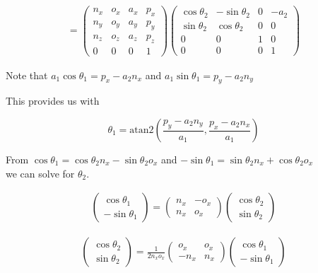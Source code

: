 \[\begin{aligned}
= \begin{pmatrix}
         n_x & o_x & a_x & p_x \\
         n_y & o_y & a_y & p_y\\
         n_z & o_z & a_z & p_z \\ 0 & 0 & 0 & 1\end{pmatrix}
         \begin{pmatrix}\cos \theta_2 & -\sin \theta_2 & 0 & -a_2  \\
         \sin \theta_2 & \cos \theta_2 & 0 & 0 \\ 0 &0 & 1 & 0 \\
         0& 0& 0& 1 \end{pmatrix}
\end{aligned}\]

Note that \(a_1\cos\theta_1 = p_x - a_2n_x\) and
\(a_1\sin\theta_1 = p_y - a_2n_y\)

This provides us with

\[\theta_1 = \mbox{atan2}\left(\frac{p_y - a_2n_y}{a_1} , \frac{p_x - a_2n_x}{a_1}\right)\]

From \(\cos \theta_1 = \cos \theta_2 n_x - \sin \theta_2o_x\) and
\(-\sin \theta_1 = \sin \theta_2 n_x + \cos \theta_2o_x\)\\
we can solve for \(\theta_2\).

\[\begin{aligned}
\begin{pmatrix} \cos \theta_1 \\ -\sin \theta_1 \end{pmatrix}
  = \begin{pmatrix}n_x & -o_x  \\ n_x & o_x \end{pmatrix}
  \begin{pmatrix} \cos \theta_2 \\ \sin \theta_2 \end{pmatrix}
\end{aligned}\]

\[\begin{aligned}
\begin{pmatrix} \cos \theta_2 \\ \sin \theta_2 \end{pmatrix}
  = \frac{1}{2n_xo_x}\begin{pmatrix}o_x & o_x  \\ -n_x & n_x \end{pmatrix}
  \begin{pmatrix} \cos \theta_1 \\ -\sin \theta_1 \end{pmatrix}
\end{aligned}\]

